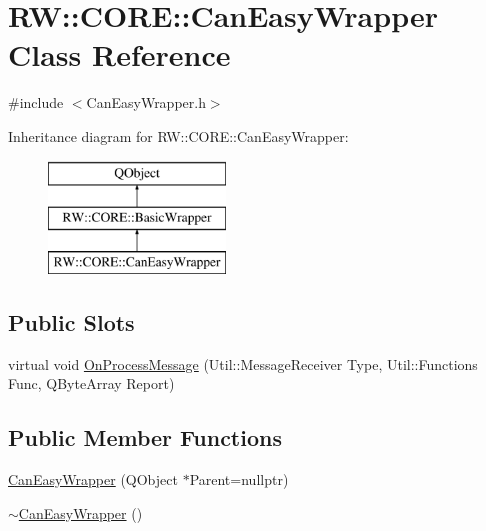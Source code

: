 \hypertarget{class_r_w_1_1_c_o_r_e_1_1_can_easy_wrapper}{}\section{RW\+:\+:C\+O\+RE\+:\+:Can\+Easy\+Wrapper Class Reference}
\label{class_r_w_1_1_c_o_r_e_1_1_can_easy_wrapper}


{\ttfamily \#include $<$Can\+Easy\+Wrapper.\+h$>$}

Inheritance diagram for RW\+:\+:C\+O\+RE\+:\+:Can\+Easy\+Wrapper\+:\begin{figure}[H]
\begin{center}
\leavevmode
\includegraphics[height=3.000000cm]{class_r_w_1_1_c_o_r_e_1_1_can_easy_wrapper}
\end{center}
\end{figure}
\subsection*{Public Slots}
\begin{DoxyCompactItemize}
\item 
virtual void \hyperlink{class_r_w_1_1_c_o_r_e_1_1_can_easy_wrapper_a1de1ab208ac14badbf4b1483e7821801}{On\+Process\+Message} (Util\+::\+Message\+Receiver Type, Util\+::\+Functions Func, Q\+Byte\+Array Report)
\end{DoxyCompactItemize}
\subsection*{Public Member Functions}
\begin{DoxyCompactItemize}
\item 
\hyperlink{class_r_w_1_1_c_o_r_e_1_1_can_easy_wrapper_a2f8ebb5aeeca7a378a50b354cdb993fd}{Can\+Easy\+Wrapper} (Q\+Object $\ast$Parent=nullptr)
\item 
\hyperlink{class_r_w_1_1_c_o_r_e_1_1_can_easy_wrapper_af4170177b064c01efb78253f7ee78d86}{$\sim$\+Can\+Easy\+Wrapper} ()
\end{DoxyCompactItemize}
